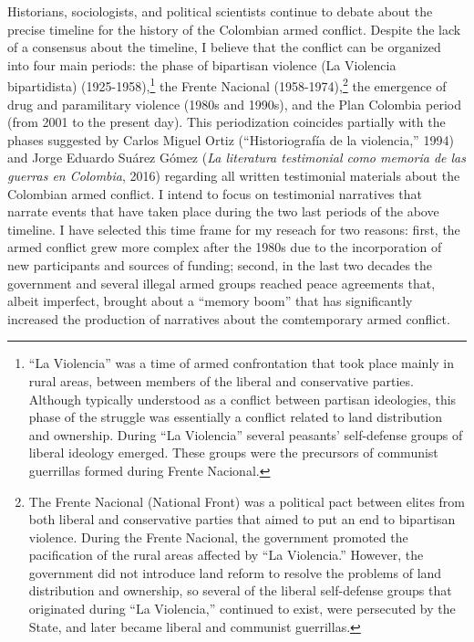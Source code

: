\documentclass[
  11pt,
,
onecolumn,
openany
]{book}
\begin{document}
Historians, sociologists, and political scientists continue to debate about
the precise timeline for the history of the Colombian armed conflict. Despite
the lack of a consensus about the timeline, I believe that the conflict can be
organized into four main periods: the phase of bipartisan violence (La
Violencia bipartidista) (1925-1958),\footnote{``La Violencia'' was a time of
  armed confrontation that took place mainly in rural areas, between members
  of the liberal and conservative parties. Although typically understood as a
  conflict between partisan ideologies, this phase of the struggle was
  essentially a conflict related to land distribution and ownership. During
  ``La Violencia'' several peasants' self-defense groups of liberal ideology
  emerged. These groups were the precursors of communist guerrillas formed
  during Frente Nacional.} the Frente Nacional (1958-1974),\footnote{The
  Frente Nacional (National Front) was a political pact between elites from
  both liberal and conservative parties that aimed to put an end to bipartisan
  violence. During the Frente Nacional, the government promoted the
  pacification of the rural areas affected by ``La Violencia.'' However, the
  government did not introduce land reform to resolve the problems of land
  distribution and ownership, so several of the liberal self-defense groups
  that originated during ``La Violencia,'' continued to exist, were persecuted
  by the State, and later became liberal and communist guerrillas.} the
emergence of drug and paramilitary violence (1980s and 1990s), and the Plan
Colombia period (from 2001 to the present day). This periodization coincides
partially with the phases suggested by Carlos Miguel Ortiz (``Historiografía
de la violencia,'' 1994) and Jorge Eduardo Suárez Gómez (\emph{La literatura
testimonial como memoria de las guerras en Colombia}, 2016) regarding all
written testimonial materials about the Colombian armed conflict. I intend to
focus on testimonial narratives that narrate events that have taken place
during the two last periods of the above timeline. I have selected this time
frame for my reseach for two reasons: first, the armed conflict grew more
complex after the 1980s due to the incorporation of new participants and
sources of funding; second, in the last two decades the government and several
illegal armed groups reached peace agreements that, albeit imperfect, brought
about a ``memory boom'' that has significantly increased the production of
narratives about the comtemporary armed conflict.
\end{document}
